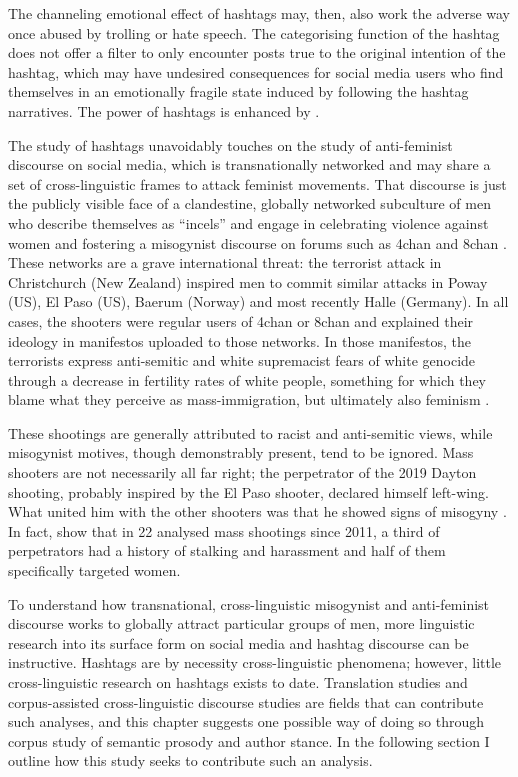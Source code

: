 \documentclass[output=paper,english,spanish,german,english]{langsci/langscibook}
\begin{document}
The channeling emotional effect of hashtags may, then, also work the adverse way once abused by trolling or hate speech. The categorising function of the hashtag does not offer a filter to only encounter posts true to the original intention of the hashtag, which may have undesired consequences for social media users who find themselves in an emotionally fragile state induced by following the hashtag narratives. The power of hashtags is enhanced by .

The study of hashtags unavoidably touches on the study of anti-feminist discourse on social media, which is transnationally networked and may share a set of cross-linguistic frames to attack feminist movements. That discourse is just the publicly visible face of a clandestine, globally networked subculture of men who describe themselves as \enquote{incels} \parencite[`involuntary celibates', see][]{valens18} and engage in celebrating violence against women and fostering a misogynist discourse on forums such as 4chan and 8chan \parencite[see][]{jaketal19}. These networks are a grave international threat: the terrorist attack in Christchurch (New Zealand) inspired men to commit similar attacks in Poway (US), El Paso (US), Baerum (Norway) and most recently Halle (Germany). In all cases, the shooters were regular users of 4chan or 8chan and explained their ideology in manifestos uploaded to those networks. In those manifestos, the terrorists express anti-semitic and white supremacist fears of white genocide through a decrease in fertility rates of white people, something for which they blame what they perceive as mass-immigration, but ultimately also feminism \parencites{distefano19}{kahsha19}.

These shootings are generally attributed to racist and anti-semitic views, while misogynist motives, though demonstrably present, tend to be ignored. Mass shooters are not necessarily all far right; the perpetrator of the 2019 Dayton shooting, probably inspired by the El Paso shooter, declared himself left-wing. What united him with the other shooters was that he showed signs of misogyny \parencite{svokos19}. In fact, \textcite{folexs19} show that in 22 analysed mass shootings since 2011, a third of perpetrators had a history of stalking and harassment and half of them specifically targeted women.

To understand how transnational, cross-linguistic misogynist and anti-fem\-i\-nist discourse works to globally attract particular groups of men, more linguistic research into its surface form on social media and hashtag discourse can be instructive. Hashtags are by necessity cross-linguistic phenomena; however, little cross-linguistic research on hashtags exists to date. Translation studies and corpus-assisted cross-linguistic discourse studies are fields that can contribute such analyses, and this chapter suggests one possible way of doing so through corpus study of semantic prosody and author stance. In the following section I outline how this study seeks to contribute such an analysis.
\end{document}
